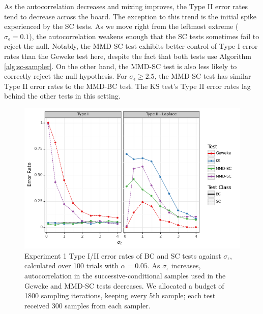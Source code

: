 \documentclass[a4paper,12pt]{article}
\begin{document}
As the autocorrelation decreases and mixing improves, the Type II error rates tend to decrease across the board. The exception to this trend is the initial spike experienced by the SC tests. As we move right from the leftmost extreme ($\sigma_{\epsilon} = 0.1$), the autocorrelation weakens enough that the SC tests sometimes fail to reject the null. Notably, the MMD-SC test exhibits better control of Type I error rates than the Geweke test here, despite the fact that both tests use Algorithm \ref{alg:sc-sampler}. On the other hand, the MMD-SC test is also less likely to correctly reject the null hypothesis. For $\sigma_{\epsilon} \geq 2.5$, the MMD-SC test has similar Type II error rates to the MMD-BC test. The KS test's Type II error rates lag behind the other tests in this setting.

\begin{figure}[H]
    \centering
    \includegraphics[width=\textwidth]{figures/gandy_scott_auto.png}
    \caption{Experiment 1 Type I/II error rates of BC and SC tests against $\sigma_{\epsilon}$, calculated over 100 trials with $\alpha=0.05$. As $\sigma_{\epsilon}$ increases, autocorrelation in the successive-conditional samples used in the Geweke and MMD-SC tests decreases. We allocated a budget of 1800 sampling iterations, keeping every 5th sample; each test received 300 samples from each sampler.}
    \label{fig:ex1_auto}
\end{figure}
\end{document}
